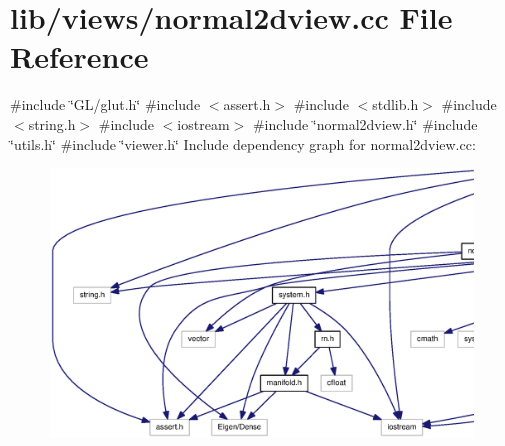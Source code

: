 \section{lib/views/normal2dview.cc \-File \-Reference}
\label{normal2dview_8cc}
{\ttfamily \#include \char`\"{}\-G\-L/glut.\-h\char`\"{}}\*
{\ttfamily \#include $<$assert.\-h$>$}\*
{\ttfamily \#include $<$stdlib.\-h$>$}\*
{\ttfamily \#include $<$string.\-h$>$}\*
{\ttfamily \#include $<$iostream$>$}\*
{\ttfamily \#include \char`\"{}normal2dview.\-h\char`\"{}}\*
{\ttfamily \#include \char`\"{}utils.\-h\char`\"{}}\*
{\ttfamily \#include \char`\"{}viewer.\-h\char`\"{}}\*
\-Include dependency graph for normal2dview.\-cc\-:
\nopagebreak
\begin{figure}[H]
\begin{center}
\leavevmode
\includegraphics[width=350pt]{normal2dview_8cc__incl}
\end{center}
\end{figure}
